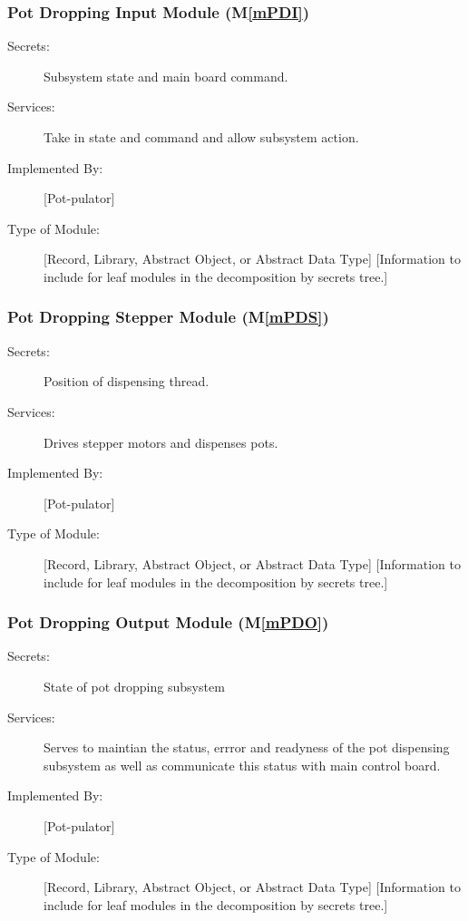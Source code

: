 \documentclass[12pt, titlepage]{article}
\newcommand{\mref}[1]{M\ref{#1}}
\begin{document}
\subsubsection{Pot Dropping Input Module (\mref{mPDI})}
\begin{description}
\item[Secrets:] Subsystem state and main board command.
\item[Services:] Take in state and command and allow subsystem action.
\item[Implemented By:] [Pot-pulator]
\item[Type of Module:] [Record, Library, Abstract Object, or Abstract Data Type]
  [Information to include for leaf modules in the decomposition by secrets tree.]
\end{description}



\subsubsection{Pot Dropping Stepper Module (\mref{mPDS})}
\begin{description}
\item[Secrets:] Position of dispensing thread.
\item[Services:] Drives stepper motors and dispenses pots.
\item[Implemented By:] [Pot-pulator]
\item[Type of Module:] [Record, Library, Abstract Object, or Abstract Data Type]
  [Information to include for leaf modules in the decomposition by secrets tree.]
\end{description}

\subsubsection{Pot Dropping Output Module (\mref{mPDO})}
\begin{description}
\item[Secrets:] State of pot dropping subsystem
\item[Services:] Serves to maintian the status, errror and readyness of the pot dispensing subsystem as well as
communicate this status with main control board.
\item[Implemented By:] [Pot-pulator]
\item[Type of Module:] [Record, Library, Abstract Object, or Abstract Data Type]
  [Information to include for leaf modules in the decomposition by secrets tree.]
\end{description}
\end{document}
